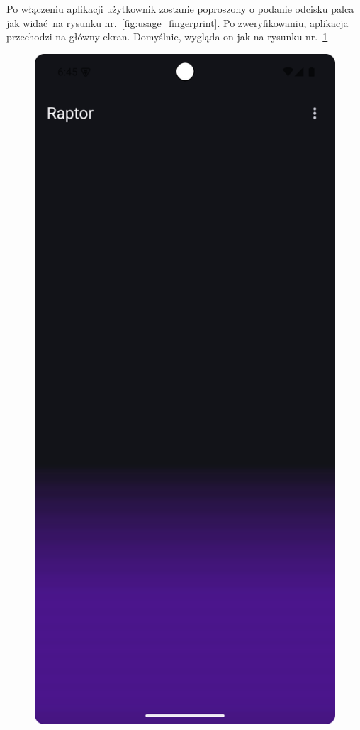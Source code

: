 Po włączeniu aplikacji użytkownik zostanie poproszony o podanie odcisku palca jak widać na rysunku nr.~\ref{fig:usage_fingerprint}. Po zweryfikowaniu, aplikacja przechodzi na główny ekran. Domyślnie, wygląda on jak na rysunku nr.~\ref{fig:tutorial_autorzy_pusty}

\begin{figure}[H]
	\centering
	\includegraphics[width=1\textwidth]{images/tutorial_autorzy_pusty.png}
	\caption{}
	\label{fig:tutorial_autorzy_pusty}
\end{figure}

